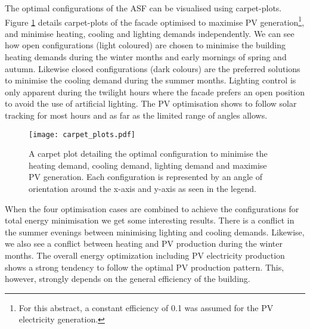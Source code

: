 


The optimal configurations of the ASF can be visualised using carpet-plots. Figure \ref{fig:carpetplot} details carpet-plots of the facade optimised to maximise PV generation\footnote{For this abstract, a constant efficiency of 0.1 was assumed for the PV electricity generation.}, and minimise heating, cooling and lighting demands independently. We can see how open configurations (light coloured) are chosen to minimise the building heating demands during the winter months and early mornings of spring and autumn. Likewise closed configurations (dark colours) are the preferred solutions to minimise the cooling demand during the summer months. Lighting control is only apparent during the twilight hours where the facade prefers an open position to avoid the use of artificial lighting. The PV optimisation shows to follow solar tracking for most hours and as far as the limited range of angles allows. 

\begin{figure}
\begin{center}
\texttt{[image: carpet\_plots.pdf]}
\caption{A carpet plot detailing the optimal configuration to minimise the heating demand, cooling demand, lighting demand and maximise PV generation. Each configuration is represented by an angle of orientation around the x-axis and y-axis as seen in the legend.}
\label{fig:carpetplot}
\end{center}
\end{figure}

When the four optimisation cases are combined to achieve the configurations for total energy minimisation we get some interesting results. There is a conflict in the summer evenings between minimising lighting and cooling demands. Likewise, we also see a conflict between heating and PV production during the winter months. The overall energy optimization including PV electricity production shows a strong tendency to follow the optimal PV production pattern. This, however, strongly depends on the general efficiency of the building. 


